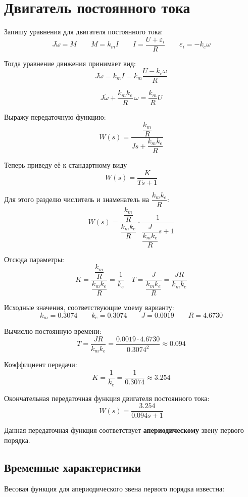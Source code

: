 \documentclass[a4paper,12pt]{article}
\begin{document}
	\newpage
	\tableofcontents
	
	
	
	\newpage
	\section{Двигатель постоянного тока}
	
	
	
	Запишу уравнения для двигателя постоянного тока:
	\[
	J\dot{\omega} = M \qquad
	M = k_m I \qquad
	I = \frac{U + \varepsilon_i}{R} \qquad
	\varepsilon_i = -k_e \omega
	\]
	
	Тогда уравнение движения принимает вид:
	\[
	J\dot{\omega} = k_m I = k_m\frac{U - k_e \omega}{R}
	\]
	
	\[
	J\dot{\omega} + \frac{k_m k_e}{R}\,\omega = \frac{k_m}{R}U
	\]
	
	Выражу передаточную функцию:
	\[
	W(s)=
	\frac{\dfrac{k_m}{R}}{Js + \dfrac{k_m k_e}{R}}
	\]
	
	Теперь приведу её к стандартному виду
	\[
	W(s)=\frac{K}{Ts + 1}
	\]
	
	Для этого разделю числитель и знаменатель на \(\dfrac{k_m k_e}{R}\):
	\[
	W(s)=
	\frac{\dfrac{k_m}{R}}{\dfrac{k_m k_e}{R}}
	\cdot
	\frac{1}{\dfrac{J}{\dfrac{k_m k_e}{R}}s + 1}
	\]
	
	Отсюда параметры:
	\[
	K =
	\frac{\dfrac{k_m}{R}}{\dfrac{k_m k_e}{R}}
	= \frac{1}{k_e}
	\quad 
	T =
	\frac{J}{\dfrac{k_m k_e}{R}}
	= \frac{JR}{k_m k_e}
	\]
	
	Исходные значения, соответствующие моему варианту:
	\[
	k_m = 0.3074 \qquad
	k_e = 0.3074 \qquad
	J = 0.0019 \qquad
	R = 4.6730
	\]
	
	Вычислю постоянную времени:
	\[
	T = \frac{JR}{k_m k_e}
	= \frac{0.0019 \cdot 4.6730}{0.3074^2}
	\approx 0.094
	\]
	
	Коэффициент передачи:
	\[
	K = \frac{1}{k_e} = \frac{1}{0.3074} \approx 3.254
	\]
	
	Окончательная передаточная функция двигателя постоянного тока:
	\[
	W(s) = \frac{3.254}{0.094s + 1}
	\]
	
	Данная передаточная функция соответствует \textbf{апериодическому} звену первого порядка.
	
	\subsection{Временные характеристики}
	
	Весовая функция для апериодического звена первого порядка известна:
	
\end{document}

